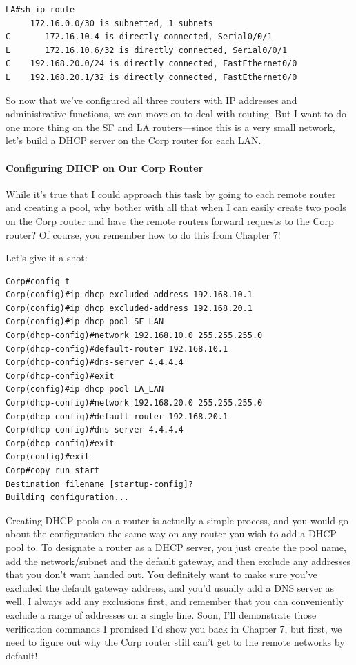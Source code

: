 \begin{verbatim}
LA#sh ip route
     172.16.0.0/30 is subnetted, 1 subnets
C       172.16.10.4 is directly connected, Serial0/0/1
L       172.16.10.6/32 is directly connected, Serial0/0/1
C    192.168.20.0/24 is directly connected, FastEthernet0/0
L    192.168.20.1/32 is directly connected, FastEthernet0/0
\end{verbatim}

So now that we've configured all three routers with IP addresses and
administrative functions, we can move on to deal with routing. But I
want to do one more thing on the SF and LA routers---since this is a
very small network, let's build a DHCP server on the Corp router for
each LAN.

\paragraph{Configuring DHCP on Our Corp Router}

While it's true that I could approach this task by going to each remote
router and creating a pool, why bother with all that when I can easily
create two pools on the Corp router and have the remote routers forward
requests to the Corp router? Of course, you remember how to do this from
Chapter 7!

Let's give it a shot:

\begin{verbatim}
Corp#config t
Corp(config)#ip dhcp excluded-address 192.168.10.1
Corp(config)#ip dhcp excluded-address 192.168.20.1
Corp(config)#ip dhcp pool SF_LAN
Corp(dhcp-config)#network 192.168.10.0 255.255.255.0
Corp(dhcp-config)#default-router 192.168.10.1
Corp(dhcp-config)#dns-server 4.4.4.4
Corp(dhcp-config)#exit
Corp(config)#ip dhcp pool LA_LAN
Corp(dhcp-config)#network 192.168.20.0 255.255.255.0
Corp(dhcp-config)#default-router 192.168.20.1
Corp(dhcp-config)#dns-server 4.4.4.4
Corp(dhcp-config)#exit
Corp(config)#exit
Corp#copy run start
Destination filename [startup-config]?
Building configuration...
\end{verbatim}

Creating DHCP pools on a router is actually a simple process, and you
would go about the configuration the same way on any router you wish to
add a DHCP pool to. To designate a router as a DHCP server, you just
create the pool name, add the network/subnet and the default gateway,
and then exclude any addresses that you don't want handed out. You
definitely want to make sure you've excluded the default gateway
address, and you'd usually add a DNS server as well. I always add any
exclusions first, and remember that you can conveniently exclude a range
of addresses on a single line. Soon, I'll demonstrate those verification
commands I promised I'd show you back in Chapter 7, but first, we need
to figure out why the Corp router still can't get to the remote networks
by default!

